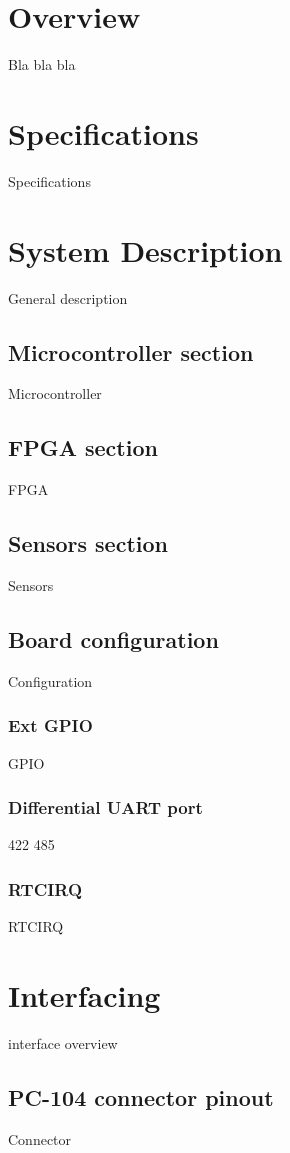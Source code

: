 \documentclass[12pt,a4paper]{report}
\begin{document}
\chapter{Overview}
Bla bla bla

\chapter{Specifications}
Specifications

\chapter{System Description}
General description
\section{Microcontroller section}
Microcontroller
\section{FPGA section}
FPGA
\section{Sensors section}
Sensors

\section{Board configuration}
Configuration

\subsection{Ext GPIO}
GPIO

\subsection{Differential UART port}
422 485

\subsection{RTCIRQ}
RTCIRQ

\chapter{Interfacing}
interface overview

\section{PC-104 connector pinout}
Connector
\end{document}
